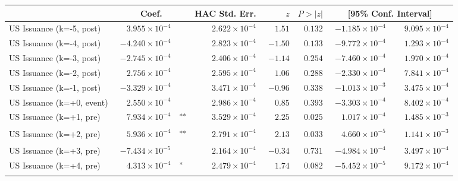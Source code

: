 \documentclass[10pt]{article}
\begin{document}
\noindent\begin{tabular}{@{}l|r@{}l rrr rr@{}}
\hline
 & \multicolumn{2}{c}{Coef.} & HAC Std. Err. & $z$ & $P>|z|$ & \multicolumn{2}{c}{[95\% Conf. Interval]} \\
\hline
US Issuance (k=-5, post) & $\phantom{-}3.955\!\times\!10^{-4}$ & \textsuperscript{} & $\phantom{-}2.622\!\times\!10^{-4}$ & $\phantom{-}1.51$ & $0.132$ & $-1.185\!\times\!10^{-4}$ & $\phantom{-}9.095\!\times\!10^{-4}$ \\
US Issuance (k=-4, post) & $-4.240\!\times\!10^{-4}$ & \textsuperscript{} & $\phantom{-}2.823\!\times\!10^{-4}$ & $-1.50$ & $0.133$ & $-9.772\!\times\!10^{-4}$ & $\phantom{-}1.293\!\times\!10^{-4}$ \\
US Issuance (k=-3, post) & $-2.745\!\times\!10^{-4}$ & \textsuperscript{} & $\phantom{-}2.406\!\times\!10^{-4}$ & $-1.14$ & $0.254$ & $-7.460\!\times\!10^{-4}$ & $\phantom{-}1.970\!\times\!10^{-4}$ \\
US Issuance (k=-2, post) & $\phantom{-}2.756\!\times\!10^{-4}$ & \textsuperscript{} & $\phantom{-}2.595\!\times\!10^{-4}$ & $\phantom{-}1.06$ & $0.288$ & $-2.330\!\times\!10^{-4}$ & $\phantom{-}7.841\!\times\!10^{-4}$ \\
US Issuance (k=-1, post) & $-3.329\!\times\!10^{-4}$ & \textsuperscript{} & $\phantom{-}3.471\!\times\!10^{-4}$ & $-0.96$ & $0.338$ & $-1.013\!\times\!10^{-3}$ & $\phantom{-}3.475\!\times\!10^{-4}$ \\
US Issuance (k=+0, event) & $\phantom{-}2.550\!\times\!10^{-4}$ & \textsuperscript{} & $\phantom{-}2.986\!\times\!10^{-4}$ & $\phantom{-}0.85$ & $0.393$ & $-3.303\!\times\!10^{-4}$ & $\phantom{-}8.402\!\times\!10^{-4}$ \\
US Issuance (k=+1, pre) & $\phantom{-}7.934\!\times\!10^{-4}$ & \textsuperscript{**} & $\phantom{-}3.529\!\times\!10^{-4}$ & $\phantom{-}2.25$ & $0.025$ & $\phantom{-}1.017\!\times\!10^{-4}$ & $\phantom{-}1.485\!\times\!10^{-3}$ \\
US Issuance (k=+2, pre) & $\phantom{-}5.936\!\times\!10^{-4}$ & \textsuperscript{**} & $\phantom{-}2.791\!\times\!10^{-4}$ & $\phantom{-}2.13$ & $0.033$ & $\phantom{-}4.660\!\times\!10^{-5}$ & $\phantom{-}1.141\!\times\!10^{-3}$ \\
US Issuance (k=+3, pre) & $-7.434\!\times\!10^{-5}$ & \textsuperscript{} & $\phantom{-}2.164\!\times\!10^{-4}$ & $-0.34$ & $0.731$ & $-4.984\!\times\!10^{-4}$ & $\phantom{-}3.497\!\times\!10^{-4}$ \\
US Issuance (k=+4, pre) & $\phantom{-}4.313\!\times\!10^{-4}$ & \textsuperscript{*} & $\phantom{-}2.479\!\times\!10^{-4}$ & $\phantom{-}1.74$ & $0.082$ & $-5.452\!\times\!10^{-5}$ & $\phantom{-}9.172\!\times\!10^{-4}$ \\

\end{tabular}
\end{document}
